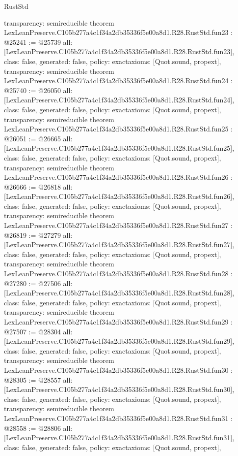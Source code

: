 \begin{lexlean}{RustStd}
\begin{coremodule}
{  transparency: semireducible
}
theorem LexLeanPreserve.C105b277a4c1f34a2db35336f5e00a8d1.R28.RustStd.fun23 : @25241 := @25739 {
  all: [LexLeanPreserve.C105b277a4c1f34a2db35336f5e00a8d1.R28.RustStd.fun23],
  class: false,
  generated: false,
  policy: exact{axioms: [Quot.sound, propext]},
  transparency: semireducible
}
theorem LexLeanPreserve.C105b277a4c1f34a2db35336f5e00a8d1.R28.RustStd.fun24 : @25740 := @26050 {
  all: [LexLeanPreserve.C105b277a4c1f34a2db35336f5e00a8d1.R28.RustStd.fun24],
  class: false,
  generated: false,
  policy: exact{axioms: [Quot.sound, propext]},
  transparency: semireducible
}
theorem LexLeanPreserve.C105b277a4c1f34a2db35336f5e00a8d1.R28.RustStd.fun25 : @26051 := @26665 {
  all: [LexLeanPreserve.C105b277a4c1f34a2db35336f5e00a8d1.R28.RustStd.fun25],
  class: false,
  generated: false,
  policy: exact{axioms: [Quot.sound, propext]},
  transparency: semireducible
}
theorem LexLeanPreserve.C105b277a4c1f34a2db35336f5e00a8d1.R28.RustStd.fun26 : @26666 := @26818 {
  all: [LexLeanPreserve.C105b277a4c1f34a2db35336f5e00a8d1.R28.RustStd.fun26],
  class: false,
  generated: false,
  policy: exact{axioms: [Quot.sound, propext]},
  transparency: semireducible
}
theorem LexLeanPreserve.C105b277a4c1f34a2db35336f5e00a8d1.R28.RustStd.fun27 : @26819 := @27279 {
  all: [LexLeanPreserve.C105b277a4c1f34a2db35336f5e00a8d1.R28.RustStd.fun27],
  class: false,
  generated: false,
  policy: exact{axioms: [Quot.sound, propext]},
  transparency: semireducible
}
theorem LexLeanPreserve.C105b277a4c1f34a2db35336f5e00a8d1.R28.RustStd.fun28 : @27280 := @27506 {
  all: [LexLeanPreserve.C105b277a4c1f34a2db35336f5e00a8d1.R28.RustStd.fun28],
  class: false,
  generated: false,
  policy: exact{axioms: [Quot.sound, propext]},
  transparency: semireducible
}
theorem LexLeanPreserve.C105b277a4c1f34a2db35336f5e00a8d1.R28.RustStd.fun29 : @27507 := @28304 {
  all: [LexLeanPreserve.C105b277a4c1f34a2db35336f5e00a8d1.R28.RustStd.fun29],
  class: false,
  generated: false,
  policy: exact{axioms: [Quot.sound, propext]},
  transparency: semireducible
}
theorem LexLeanPreserve.C105b277a4c1f34a2db35336f5e00a8d1.R28.RustStd.fun30 : @28305 := @28557 {
  all: [LexLeanPreserve.C105b277a4c1f34a2db35336f5e00a8d1.R28.RustStd.fun30],
  class: false,
  generated: false,
  policy: exact{axioms: [Quot.sound, propext]},
  transparency: semireducible
}
theorem LexLeanPreserve.C105b277a4c1f34a2db35336f5e00a8d1.R28.RustStd.fun31 : @28558 := @28806 {
  all: [LexLeanPreserve.C105b277a4c1f34a2db35336f5e00a8d1.R28.RustStd.fun31],
  class: false,
  generated: false,
  policy: exact{axioms: [Quot.sound, propext]},
}
\end{coremodule}
\end{lexlean}

